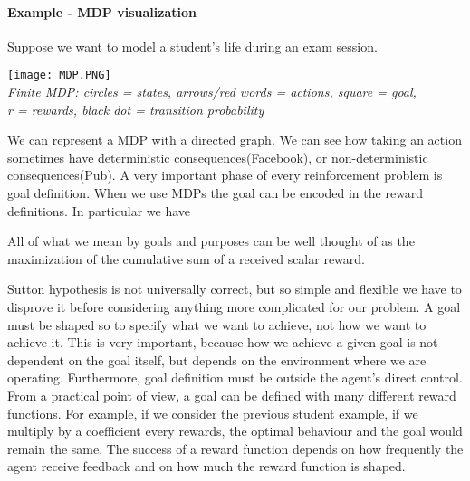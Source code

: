 \documentclass[main.tex]{subfiles}
\begin{document}
\paragraph{Example - MDP visualization} Suppose we want to model a student's life during an exam session.
\begin{center}
    \texttt{[image: MDP.PNG]}\\
    \textit{Finite MDP: circles = states, arrows/red words = actions, square = goal,}\\
    \textit{r = rewards, black dot = transition probability}
\end{center}
We can represent a MDP with a directed graph. We can see how taking an action sometimes have deterministic consequences(Facebook), or non-deterministic consequences(Pub).
\newline
\newline
A very important phase of every reinforcement problem is goal definition. When we use MDPs the goal can be encoded in the reward definitions. In particular we have
\begin{definition}
All of what we mean by goals and purposes can be well thought of as the maximization of the cumulative sum of a received scalar reward.
\end{definition} 
Sutton hypothesis is not universally correct, but so simple and flexible we have to disprove it before considering anything more complicated for our problem.
A goal must be shaped so to specify what we want to achieve, not how we want to
achieve it. This is very important, because how we achieve a given goal is not dependent on the goal itself, but depends on the environment where we are operating. Furthermore, goal definition must be outside the agent’s direct control. From a practical point of view, a goal can be defined with many different reward functions. For example, if we consider the previous student example, if we multiply by a coefficient every rewards, the optimal behaviour and the goal would remain the same. The success of a reward function depends on how frequently the agent receive feedback and on how much the reward function is shaped\footnotemark. 
\end{document}
